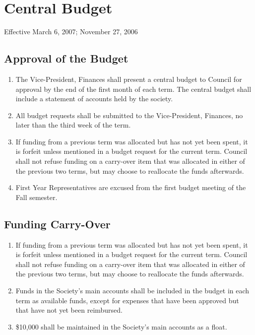 \section{Central Budget}
Effective March 6, 2007; November 27, 2006

\subsection{Approval of the Budget}
\begin{enumerate}
\item The Vice-President, Finances shall present a central budget to Council for approval by the end of the first month of each term. The central budget shall include a statement of accounts held by the society.
\item All budget requests shall be submitted to the Vice-President, Finances, no later than the third week of the term.
\item If funding from a previous term was allocated but has not yet been spent, it is forfeit unless mentioned in a budget request for the current term. Council shall not refuse funding on a carry-over item that was allocated in either of the previous two terms, but may choose to reallocate the funds afterwards.
\item First Year Representatives are excused from the first budget meeting of the Fall semester.
\end{enumerate}


\subsection{Funding Carry-Over}
\begin{enumerate}
\item If funding from a previous term was allocated but has not yet been spent, it is forfeit unless mentioned in a budget request for the current term. Council shall not refuse funding on a carry-over item that was allocated in either of the previous two terms, but may choose to reallocate the funds afterwards.
\item Funds in the Society's main accounts shall be included in the budget in each term as available funds, except for expenses that have been approved but that have not yet been reimbursed.
\item \$10,000 shall be maintained in the Society's main accounts as a float.
\end{enumerate}

